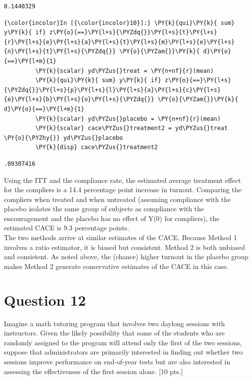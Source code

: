 \documentclass[11pt,notitlepage]{article}\usepackage[]{graphicx}\usepackage[]{color}
\makeatletter
\newenvironment{kframe}{%
 \def\at@end@of@kframe{}%
 \ifinner\ifhmode%
  \def\at@end@of@kframe{\end{minipage}}%
  \begin{minipage}{\columnwidth}%
 \fi\fi%
 \def\FrameCommand##1{\hskip\@totalleftmargin \hskip-\fboxsep
 \colorbox{shadecolor}{##1}\hskip-\fboxsep
     \hskip-\linewidth \hskip-\@totalleftmargin \hskip\columnwidth}%
 \MakeFramed {\advance\hsize-\width
   \@totalleftmargin\z@ \linewidth\hsize
   \@setminipage}}%
 {\par\unskip\endMakeFramed%
 \at@end@of@kframe}
\newenvironment{knitrout}{}{} %
\makeatother
\begin{document}
\begin{enumerate}[a)]
\begin{knitrout}
\begin{kframe}
    \begin{Verbatim}[commandchars=\\\{\}]
0.1440329
    \end{Verbatim}

    \begin{Verbatim}[commandchars=\\\{\}]
{\color{incolor}In [{\color{incolor}10}]:} \PY{k}{qui}\PY{k}{ sum} y\PY{k}{ if} z\PY{o}{==}\PY{l+s}{\PYZdq{}}\PY{l+s}{t}\PY{l+s}{r}\PY{l+s}{e}\PY{l+s}{a}\PY{l+s}{t}\PY{l+s}{m}\PY{l+s}{e}\PY{l+s}{n}\PY{l+s}{t}\PY{l+s}{\PYZdq{}} \PY{o}{\PYZam{}}\PY{k}{ d}\PY{o}{==}\PY{l+m}{1}
         \PY{k}{scalar} yd\PYZus{}treat = \PY{n+nf}{r}(mean)
         \PY{k}{qui}\PY{k}{ sum} y\PY{k}{ if} z\PY{o}{==}\PY{l+s}{\PYZdq{}}\PY{l+s}{p}\PY{l+s}{l}\PY{l+s}{a}\PY{l+s}{c}\PY{l+s}{e}\PY{l+s}{b}\PY{l+s}{o}\PY{l+s}{\PYZdq{}} \PY{o}{\PYZam{}}\PY{k}{ d}\PY{o}{==}\PY{l+m}{1}
         \PY{k}{scalar} yd\PYZus{}placebo = \PY{n+nf}{r}(mean)
         \PY{k}{scalar} cace\PYZus{}treatment2 = yd\PYZus{}treat \PY{o}{\PYZhy{}} yd\PYZus{}placebo
         \PY{k}{disp} cace\PYZus{}treatment2
\end{Verbatim}

    \begin{Verbatim}[commandchars=\\\{\}]
.09307416
    \end{Verbatim}
\end{kframe}
\end{knitrout}

Using the ITT and the compliance rate, the estimated average treatment effect for the compliers is a 14.4 percentage point increase in turnout. Comparing the compliers when treated and when untreated (assuming compliance with the placebo isolates the same group of subjects as compliance with the encouragement and the placebo has no effect of Y(0) for compliers), the estimated CACE is 9.3 percentage points. \\

The two methods arrive at similar estimates of the CACE. Because Method 1 involves a ratio estimator, it is biased but consistent.  Method 2 is both unbiased and consistent.  As noted above, the (chance) higher turnout in the placebo group makes Method 2 generate conservative estimates of the CACE in this case.
\end{enumerate}

\section*{Question 12}
Imagine a math tutoring program that involves two daylong sessions with instructors. Given the likely possibility that some of the students who are randomly assigned to the program will attend only the first of the two sessions, suppose that administrators are primarily interested in finding out whether two sessions improve performance on end-of-year tests but are also interested in assessing the effectiveness of the first session alone. [10 pts.]
\end{document}
